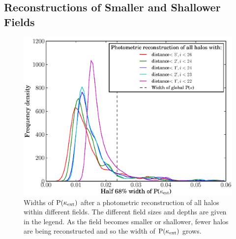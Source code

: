 \documentclass[useAMS,usenatbib]{mn2e}
\begin{document}
\subsection{Reconstructions of Smaller and Shallower Fields}

\begin{figure}
\includegraphics[width=\columnwidth]{widths2.eps}
\caption{Widths of ${\rm P}(\kappa_{\rm ext})$ after a photometric reconstruction of all halos within different fields. The different field sizes and depths are given in the legend. As the field becomes smaller or shallower, fewer halos are being reconstructed and so the width of ${\rm P}(\kappa_{\rm ext})$ grows.}
\label{fig:width2}
\end{figure}
\end{document}
